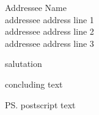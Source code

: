 \documentclass[
    version=last, %
    fontsize=11pt, %
    paper=a4, %
    DIN5008A, %
    ngerman,english, %
]{scrlttr2}
\begin{document}

\removereffields %

\begin{letter}{
    Addressee Name\\
    addressee address line 1\\
    addressee address line 2\\
    addressee address line 3
}
\opening{salutation}

\Blindtext[7][1]

\closing{concluding text}

\ps postscript text



\end{letter}

\end{document}
